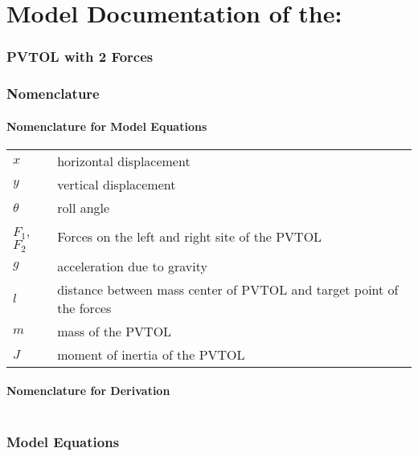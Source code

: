 \documentclass[10pt,a4paper]{article}
\begin{document}
	\part*{Model Documentation of the:}
	\section*{PVTOL with 2 Forces} %
	
	
	\section{Nomenclature} %
	\subsection{Nomenclature for Model Equations} %
	
	\begin{tabular}{ll}
		$x$ & horizontal displacement \\
		$y$ & vertical displacement \\
		$\theta$ & roll angle \\
		$F_1$, $F_2$ & Forces on the left and right site of the PVTOL \\
		$g$ & acceleration due to gravity \\
		$l$ & distance between mass center of PVTOL and target point of the forces \\
		$m$ & mass of the PVTOL \\
		$J$ & moment of inertia of the PVTOL		
	\end{tabular}
	
	\subsection{Nomenclature for Derivation} %
	
	\begin{tabular}{ll}
	\end{tabular}
	
	
	\section{Model Equations} %
	
\end{document}

